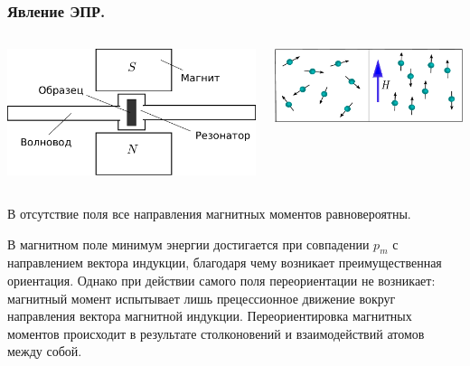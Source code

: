 \documentclass{beamer}
\begin{document}
\begin{frame}[r]
\frametitle{Явление ЭПР.}
\begin{columns}[t]
\begin{column}{0.45\linewidth}
\begin{block}{}
\includegraphics[width=1\columnwidth]{equip}
\end{block}
\end{column}

\begin{column}{0.45\linewidth}
\begin{block}{}
\includegraphics[width=1\columnwidth]{order}
\end{block}
\end{column}
\end{columns}

\medskip

\scriptsize{
В отсутствие поля все направления магнитных моментов равновероятны.

В магнитном поле минимум энергии достигается при совпадении $p_{m}$ с направлением вектора индукции, благодаря чему возникает преимущественная ориентация. Однако при действии самого поля переориентации не возникает: магнитный момент испытывает лишь прецессионное движение вокруг направления вектора магнитной индукции. Переориентировка магнитных моментов происходит в результате столконовений и взаимодействий атомов между собой.
}
\end{frame}
\end{document}
